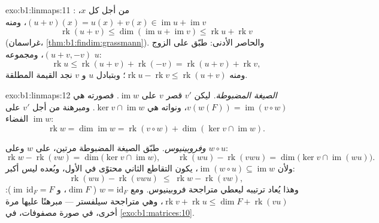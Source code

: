 \begin{solution}{exo:b1:linmaps:11}
: من أجل كل $x$، $(u + v)(x) = u(x) + v(x) \in
\operatorname{im} u + \operatorname{im} v$، ومنه
\[
\operatorname{rk}(u + v)
\leq \dim(\operatorname{im} u + \operatorname{im} v)
\leq \operatorname{rk} u + \operatorname{rk} v
\]
(غراسمان، \cref{thm:b1:findim:grassmann}). والحاصر الأدنى: طبّق
 على الزوج $(u + v, -v)$، ومجموعه $u$:
\[
\operatorname{rk} u \leq \operatorname{rk}(u + v) +
\operatorname{rk}(-v) = \operatorname{rk}(u + v) +
\operatorname{rk} v,
\]
ومنه $\operatorname{rk} u - \operatorname{rk} v \leq
\operatorname{rk}(u+v)$؛ وبتبادل $u$ و $v$ نجد القيمة
المطلقة.
\end{solution}

\begin{solution}{exo:b1:linmaps:12}
\emph{الصيغة المضبوطة.} ليكن $v'$ قصر $v$ على
 $\operatorname{im} w$. فصورته هي $v(w(F)) =
\operatorname{im}(v \circ w)$، ونواته هي $\ker v \cap
\operatorname{im} w$. ومبرهنة  من أجل $v'$ على الفضاء
$\operatorname{im} w$:
\[
\operatorname{rk} w = \dim\operatorname{im} w
= \operatorname{rk}(v \circ w) + \dim(\ker v \cap
\operatorname{im} w) .
\]

\emph{وفروبينيوس.} طبّق الصيغة المضبوطة مرتين، على $w$ وعلى
$w \circ u$:
\[
\operatorname{rk} w - \operatorname{rk}(vw)
= \dim\bigl(\ker v \cap \operatorname{im} w\bigr),
\qquad
\operatorname{rk}(wu) - \operatorname{rk}(vwu)
= \dim\bigl(\ker v \cap \operatorname{im}(wu)\bigr) .
\]
ولأن $\operatorname{im}(w \circ u) \subseteq \operatorname{im}
w$، يكون التقاطع الثاني محتوًى في الأول، وبُعده
ليس أكبر:
\[
\operatorname{rk}(wu) - \operatorname{rk}(vwu)
\;\leq\; \operatorname{rk} w - \operatorname{rk}(vw) ,
\]
وهذا يُعاد ترتيبه ليعطي متراجحة فروبينيوس. ومع $w =
\mathrm{id}_F$ ( $\dim F$، و $\operatorname{im}\,
\mathrm{id}_F = F$): $\operatorname{rk} v + \operatorname{rk} u
\leq \dim F + \operatorname{rk}(vu)$، وهي متراجحة سيلفستر ---
مبرهنًا عليها مرة أخرى، في صورة مصفوفات، في \cref{exo:b1:matrices:10}.
\end{solution}

